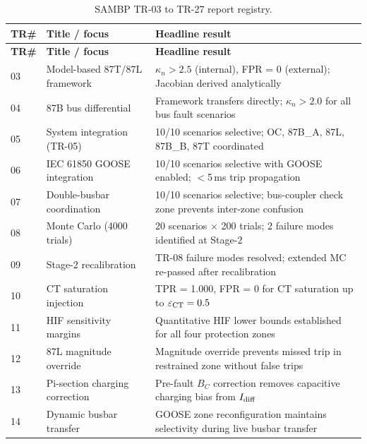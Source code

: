 \documentclass[11pt,a4paper]{article}
\begin{document}
\begin{longtable}{p{1.0cm}p{4.8cm}p{7.0cm}}
\caption{SAMBP TR-03 to TR-27 report registry.}
\label{tab:registry}\\
\toprule
\textbf{TR\#} & \textbf{Title / focus} & \textbf{Headline result} \\
\midrule
\endfirsthead
\toprule
\textbf{TR\#} & \textbf{Title / focus} & \textbf{Headline result} \\
\midrule
\endhead
\bottomrule
\endfoot
%
\rowcolor{arc1col!10}
03 & Model-based 87T/87L framework & $\kappa_n > 2.5$ (internal), FPR = 0 (external); Jacobian derived analytically \\
\rowcolor{arc1col!10}
04 & 87B bus differential           & Framework transfers directly; $\kappa_n > 2.0$ for all bus fault scenarios \\
\midrule
\rowcolor{arc2col!10}
05 & System integration (TR-05)     & 10/10 scenarios selective; OC, 87B\_A, 87L, 87B\_B, 87T coordinated \\
\rowcolor{arc2col!10}
06 & IEC 61850 GOOSE integration    & 10/10 scenarios selective with GOOSE enabled; $<$5\,ms trip propagation \\
\rowcolor{arc2col!10}
07 & Double-busbar coordination     & 10/10 scenarios selective; bus-coupler check zone prevents inter-zone confusion \\
\rowcolor{arc2col!10}
08 & Monte Carlo (4000 trials)      & 20 scenarios $\times$ 200 trials; 2 failure modes identified at Stage-2 \\
\rowcolor{arc2col!10}
09 & Stage-2 recalibration          & TR-08 failure modes resolved; extended MC re-passed after recalibration \\
\rowcolor{arc2col!10}
10 & CT saturation injection        & TPR = 1.000, FPR = 0 for CT saturation up to $\varepsilon_{\rm CT} = 0.5$ \\
\rowcolor{arc2col!10}
11 & HIF sensitivity margins        & Quantitative HIF lower bounds established for all four protection zones \\
\midrule
\rowcolor{arc3col!10}
12 & 87L magnitude override         & Magnitude override prevents missed trip in restrained zone without false trips \\
\rowcolor{arc3col!10}
13 & Pi-section charging correction & Pre-fault $B_C$ correction removes capacitive charging bias from $I_{\rm diff}$ \\
\rowcolor{arc3col!10}
14 & Dynamic busbar transfer        & GOOSE zone reconfiguration maintains selectivity during live busbar transfer \\

\end{longtable}
\end{document}

